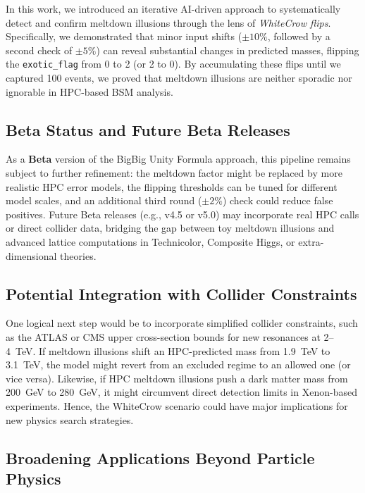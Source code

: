 \documentclass[11pt]{article}
\begin{document}
In this work, we introduced an iterative AI-driven approach
to systematically detect and confirm meltdown illusions
through the lens of \textit{WhiteCrow flips}. Specifically,
we demonstrated that minor input shifts ($\pm10\%$, followed by a second check of $\pm5\%$)
can reveal substantial changes in predicted masses,
flipping the \texttt{exotic\_flag} from 0 to 2 (or 2 to 0).
By accumulating these flips until we captured 100 events,
we proved that meltdown illusions are neither sporadic
nor ignorable in HPC-based BSM analysis.

\subsection{Beta Status and Future Beta Releases}

As a \textbf{Beta} version of the BigBig Unity Formula approach,
this pipeline remains subject to further refinement:
the meltdown factor might be replaced by more realistic HPC error models,
the flipping thresholds can be tuned for different model scales,
and an additional third round ($\pm2\%$) check could reduce false positives.
Future Beta releases (e.g., v4.5 or v5.0) may incorporate real HPC calls
or direct collider data, bridging the gap between toy meltdown illusions
and advanced lattice computations in Technicolor, Composite Higgs,
or extra-dimensional theories.

\subsection{Potential Integration with Collider Constraints}

One logical next step would be to incorporate simplified collider constraints,
such as the ATLAS or CMS upper cross-section bounds for new resonances
at 2--4~TeV. If meltdown illusions shift an HPC-predicted mass
from 1.9~TeV to 3.1~TeV, the model might revert from an excluded regime
to an allowed one (or vice versa). Likewise, if HPC meltdown illusions
push a dark matter mass from 200~GeV to 280~GeV,
it might circumvent direct detection limits in Xenon-based experiments.
Hence, the WhiteCrow scenario could have major implications
for new physics search strategies.

\subsection{Broadening Applications Beyond Particle Physics}
\end{document}
